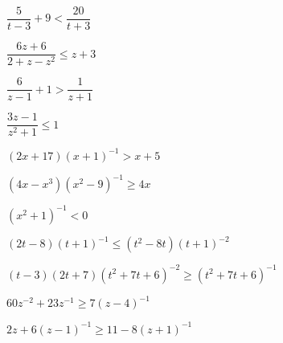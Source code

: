 \documentclass{ximera}
\begin{document}
\begin{question}
\begin{problem}
$\dfrac{5}{t-3} + 9 < \dfrac{20}{t+3}$
\end{problem}

\begin{problem}
$\dfrac{6z+6}{2+z-z^2} \leq z+3$
\end{problem}  

\begin{problem}
$\dfrac{6}{z-1} + 1 > \dfrac{1}{z+1}$
\end{problem}  

\begin{problem}
$\dfrac{3z - 1}{z^{2} + 1} \leq 1$
\end{problem}

\begin{problem}
$(2x+17)(x+1)^{-1} > x + 5$
\end{problem} 

\begin{problem}
$(4x-x^3)(x^{2} - 9)^{-1} \geq 4x$
\end{problem} 

\begin{problem}
$(x^{2} + 1)^{-1} < 0$
\end{problem}  

\begin{problem}
$(2t-8)(t+1)^{-1} \leq (t^2-8t)(t+1)^{-2}$ %
\end{problem}  

\begin{problem}
$(t-3)(2t+7)(t^2+7t+6)^{-2} \geq (t^2+7t+6)^{-1}$ %
\end{problem} 

\begin{problem}
$60z^{-2}+23z^{-1} \geq 7(z-4)^{-1}$
\end{problem} 

\begin{problem}\label{ratlineqexerciselast}
$2z+6(z-1)^{-1} \geq 11 - 8(z+1)^{-1}$
\end{problem}  
\end{question}
\end{document}
